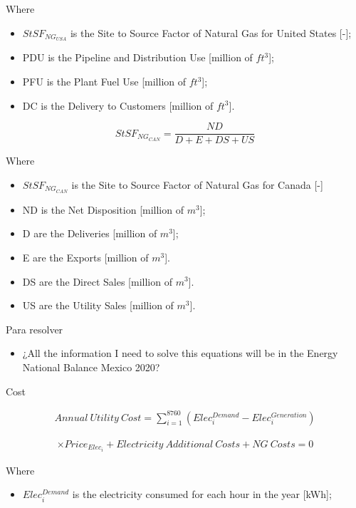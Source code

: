 \begin{enumerate*}
\begin{itemize}
Where
\begin{itemize}
\item $StSF_{NG_{USA}}$ is the Site to Source Factor of Natural Gas for United States [-];
\item PDU is the Pipeline and Distribution Use [million of $ft^3$]; 
\item PFU is the Plant Fuel Use [million of $ft^3$];
\item DC is the Delivery to Customers [million of $ft^3$].
\end{itemize}

\begin{equation}
StSF_{NG_{CAN}} = \frac{ND}{D + E + DS + US}
\end{equation}

Where
\begin{itemize}
\item $StSF_{NG_{CAN}}$ is the Site to Source Factor of Natural Gas for Canada [-]
\item ND is the Net Disposition [million of $m^3$]; 
\item D are the Deliveries [million of $m^3$];
\item E are the Exports [million of $m^3$].
\item DS are the Direct Sales [million of $m^3$].
\item US are the Utility Sales [million of $m^3$].
\end{itemize}




Para resolver
\begin{itemize}
\item ¿All the information I need to solve this equations will be in the Energy National Balance Mexico 2020?
\end{itemize}


Cost

\begin{eqnarray*}
Annual~Utility~Cost = \sum_{i=1}^{8760} (Elec_{i}^{Demand} - Elec_{i}^{Generation})
\end{eqnarray*}

\begin{eqnarray}
\times Price_{Elec_{i}} + Electricity~Additional~Costs + NG~Costs = 0
\end{eqnarray}

Where
\begin{itemize}
\item $Elec_{i}^{Demand}$ is the electricity consumed for each hour in the year [kWh];


\end{itemize}
\end{itemize}
\end{enumerate*}
